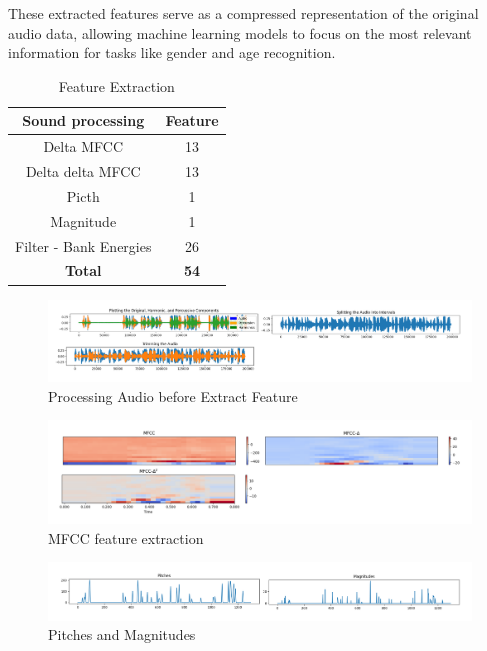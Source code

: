 \documentclass[conference, 10pt,onecolumn]{IEEEtran}
\begin{document}
These extracted features serve as a compressed representation of the original audio data, allowing machine learning models to focus on the most relevant information for tasks like gender and age recognition.
\begin{table}[htbp]
    \centering
    \begin{tabular}{|c|c|}
        \hline
        \textbf{Sound processing} & \textbf{Feature} \\
        \hline
        Delta MFCC & 13 \\
        Delta delta MFCC & 13\\
        Picth & 1 \\
        Magnitude & 1 \\ 
        Filter - Bank Energies & 26\\
        \hline
        \textbf{Total} & \textbf{54} \\
        \hline 
    \end{tabular}
    \caption{Feature Extraction}
    \label{tab:Feature Extraction}
\end{table}
\begin{figure}
    \centering
    \includegraphics[width =7 in]{Processing Audio.pdf}
    \caption{Processing Audio before Extract Feature}
    \label{fig:Processing Audio}
\end{figure}
\begin{figure}
    \centering
    \includegraphics[width=7 in]{MFCC extraction.pdf}
    \caption{MFCC feature extraction}
    \label{fig:MFCC extraction}
\end{figure}
\begin{figure}
    \centering
    \includegraphics[width=7 in]{Pitches and Magnitudes.pdf}
    \caption{Pitches and Magnitudes}
    \label{fig:Picth-Magnitudes}
\end{figure}
\end{document}
